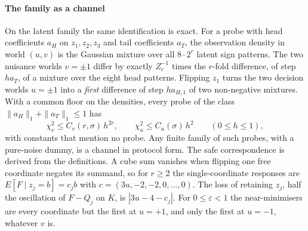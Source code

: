 \paragraph{The family as a channel} On the latent family the same identification is exact. For
a probe with head coefficients $a_{H}$ on $z_{1},z_{2},z_{3}$ and tail coefficients $a_{T}$, the
observation density in world $(u,v)$ is the Gaussian mixture over all $8\cdot2^{r}$ latent sign
patterns. The two nuisance worlds $v=\pm1$ differ by exactly
$Z_{c}^{-1}$ times the $r$-fold difference, of step $ha_{T}$, of a mixture over the eight head
patterns. Flipping $z_{1}$ turns the two decision worlds $u=\pm1$ into a \emph{first}
difference of step $h a_{H,1}$ of two non-negative mixtures. With a common floor on the
densities, every probe of the class $\|a_{H}\|_{1}+\|a_{T}\|_{1}\le1$ has
\[
\chi^{2}_{v}\le C_{v}(r,\sigma)\,h^{2r},\qquad \chi^{2}_{u}\le C_{u}(\sigma)\,h^{2}
\qquad(0\le h\le1),
\]
with constants that mention no probe. Any finite family of such probes, with a pure-noise dummy,
is a channel in protocol form. The safe correspondence is derived from the definitions. A cube
sum vanishes when flipping one free coordinate negates its summand, so for $r\ge2$ the
single-coordinate responses are $E[F\mid z_{j}=b]=c_{j}b$ with $c=(3u,-2,-2,0,\dots,0)$. The loss of
retaining $z_{j}$, half the oscillation of $F-Q_{j}$ on $K$, is $|3u-4-c_{j}|$. For
$0\le\varepsilon<1$ the near-minimisers are every coordinate but the first at $u=+1$, and only the
first at $u=-1$, whatever $v$ is.


